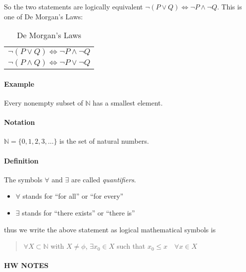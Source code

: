 \documentclass[../main.tex]{subfiles}
\begin{document}
So the two statements are logically equivalent $\neg(P \lor Q) \Longleftrightarrow \neg P \land \neg Q$.
This is one of De Morgan's Laws:

\begin{table}[ht]
    \centering
    \begin{tabular}{c}
        $\neg(P \lor Q) \Longleftrightarrow \neg P \land \neg Q$ \\
        $\neg(P \land Q) \Longleftrightarrow \neg P \lor \neg Q$
    \end{tabular}
    \caption{De Morgan's Laws}
\end{table}

\newpage
\paragraph{Example}

Every nonempty subset of $\mathbb{N}$ has a smallest element.

\paragraph{Notation} $\mathbb{N} = \{0, 1, 2, 3, \dots\}$ is the set of natural numbers.

\paragraph{Definition} The symbols $\forall$ and $\exists$ are called \emph{quantifiers}.

\begin{itemize}
    \item $\forall$ stands for ``for all'' or ``for every''
    \item $\exists$ stands for ``there exists'' or ``there is''
\end{itemize}

thus we write the above statement as logical mathematical symbols is

\begin{quote}
    $\forall X \subset \mathbb{N}$ with $X \neq \phi$, $\exists x_0 \in X$ such that
    $x_0 \leq x \quad \forall x \in X$
\end{quote}

\newpage
{}

\paragraph{HW NOTES}
\end{document}
